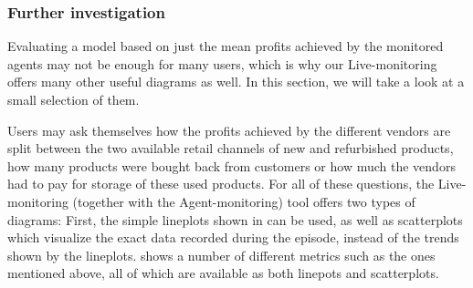 \subsubsection*{Further investigation}

Evaluating a model based on just the mean profits achieved by the monitored agents may not be enough for many users, which is why our Live-monitoring offers many other useful diagrams as well. In this section, we will take a look at a small selection of them.

Users may ask themselves how the profits achieved by the different vendors are split between the two available retail channels of new and refurbished products, how many products were bought back from customers or how much the vendors had to pay for storage of these used products. For all of these questions, the Live-monitoring (together with the Agent-monitoring) tool offers two types of diagrams: First, the simple lineplots shown in  can be used, as well as scatterplots which visualize the exact data recorded during the episode, instead of the trends shown by the lineplots.  shows a number of different metrics such as the ones mentioned above, all of which are available as both linepots and scatterplots.


